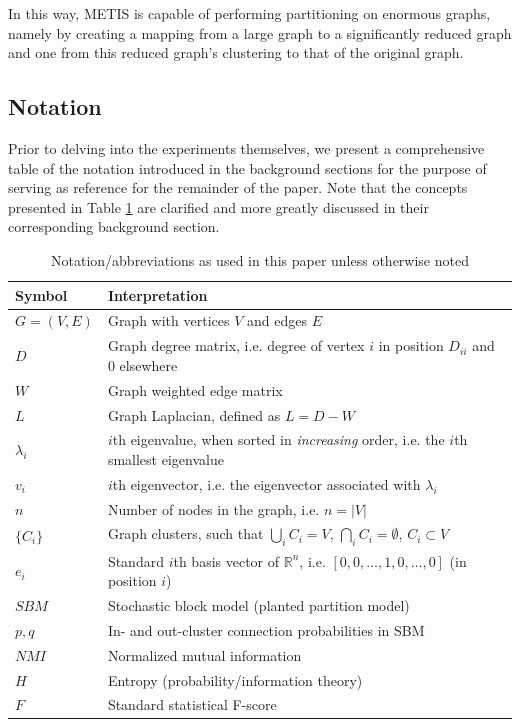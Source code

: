 \documentclass{article}
\begin{document}
In this way, METIS is capable of performing partitioning on enormous graphs, namely by creating a mapping from a large graph to a significantly reduced graph and one from this reduced graph's clustering to that of the original graph. 

\subsection{Notation}
Prior to delving into the experiments themselves, we present a comprehensive table of the notation introduced in the background sections for the purpose of serving as reference for the remainder of the paper. Note that the concepts presented in Table \ref{tab:notation} are clarified and more greatly discussed in their corresponding background section. 

\begin{table}[]
\centering
\caption[Mathematical Notation]{Notation/abbreviations as used in this paper unless otherwise noted}
\label{tab:notation}
\begin{tabular}{|l|l|}
\hline 
\textbf{Symbol} & \textbf{Interpretation} \\ \hline 
$G = (V,E)$ & Graph with vertices $V$ and edges $E$ \\\hline
$D$ & Graph degree matrix, i.e. degree of vertex $i$ in position $D_{ii}$ and 0 elsewhere \\\hline
$W$ & Graph weighted edge matrix \\\hline
$L$ & Graph Laplacian, defined as $L = D - W$ \\\hline
$\lambda_i$ & $i$th eigenvalue, when sorted in \textit{increasing} order, i.e. the $i$th smallest eigenvalue \\\hline
$v_i$ & $i$th eigenvector, i.e. the eigenvector associated with $\lambda_i$ \\\hline
$n$ & Number of nodes in the graph, i.e. $n=|V|$ \\\hline
$\{C_i\}$ & Graph clusters, such that $\bigcup_i C_i = V$, $\bigcap_i C_i = \emptyset$, $C_i \subset V$ \\\hline
$e_i$ & Standard $i$th basis vector of $\mathbb{R}^n$, i.e. $[0,0,\dots,1,0,\dots,0]$ (in position $i$) \\\hline
$SBM$ & Stochastic block model (planted partition model) \\\hline
$p,q$ & In- and out-cluster connection probabilities in SBM \\\hline
$NMI$ & Normalized mutual information \\\hline
$H$ & Entropy (probability/information theory) \\\hline
$F$ & Standard statistical F-score \\\hline
\end{tabular}
\end{table}
\end{document}
